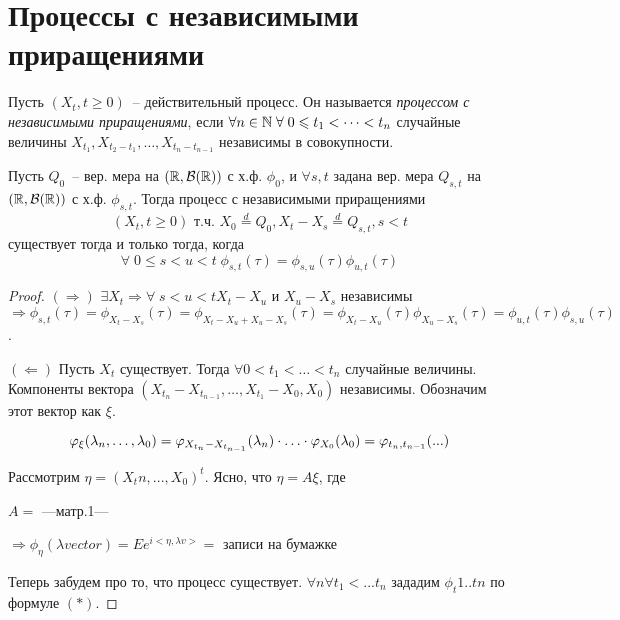 

\ifdefined\Main\else

\fi

\section{Процессы с независимыми приращениями}
\begin{definition}
Пусть $(X_t, t \geq 0)$~-- действительный процесс. Он называется \emph{процессом с
независимыми приращениями}, если $\forall n \in \mathbb{N} \; \forall \; 0 \leqslant t_1 < \dots < t_n$
случайные величины $X_{t_1}, X_{t_2 - t_1}, \dots, X_{t_n - t_{n-1}}$ независимы в совокупности.
\end{definition}

\begin{theorem}
Пусть $Q_0$~-- вер. мера на $(\mathbb{R}, \mathcal{B}(\mathbb{R}))$ с х.ф. $\phi_0$,
и $\forall s,t$ задана вер. мера $Q_{s,t}$ на $(\mathbb{R}, \mathcal{B}(\mathbb{R}))$ с х.ф. $\phi_{s,t}$.
Тогда процесс с независимыми приращениями
$$(X_t, t \geq 0) \text{ т.ч. } X_0 \overset{d}{=} Q_0, X_t - X_s \overset{d}{=} Q_{s,t}, s < t$$
существует тогда и только тогда, когда
$$\forall \; 0 \leq s < u < t \; \phi_{s,t}(\tau) = \phi_{s,u}(\tau) \phi_{u,t}(\tau)$$
\end{theorem}
\begin{proof} \forcenewline
$(\Rightarrow)$ $\exists X_t \Rightarrow \forall \; s < u < t X_t-X_u$ и
$X_u-X_s$ независимы $\Rightarrow \phi_{s,t}(\tau) = \phi_{X_t-X_s}(\tau)=
\phi_{X_t-X_u+X_u-X_s}(\tau) =
\phi_{X_t-X_u}(\tau) \phi_{X_u-X_s}(\tau) =
\phi_{u,t}(\tau) \phi_{s,u}(\tau)$.

$(\Leftarrow)$ Пусть $X_t$ существует. Тогда $\forall 0 < t_1 < \dots < t_n$
случайные величины. Компоненты вектора $(X_{t_n}-X_{t_{n-1}}, \dots, X_{t_1}-X_0, X_0)$
независимы. Обозначим этот вектор как $\xi$.

$$\varphi_\xi(\lambda_{n}, \dots, \lambda_{0}) =
\varphi_{X_{t_n}-X_{t_{n-1}}}(\lambda_n) \cdot \ldots \cdot \varphi_{X_0}(\lambda_0) =
\varphi_{t_n,t_{n-1}}(...)$$

Рассмотрим $\eta = (X_tn, ..., X_0)^t$. Ясно,  что $\eta = A\xi$, где

$A = $ ---матр.1---

$\Rightarrow \phi_\eta(\lambda vector) = Ee^{i <\eta, \lambda v>} = $
записи на бумажке

Теперь забудем про то, что процесс существует.
$\forall n \forall t_1 < ... t_n$ зададим $\phi_t1..tn$ по формуле $(*)$.
%
%
%
%
%
%
\end{proof}

